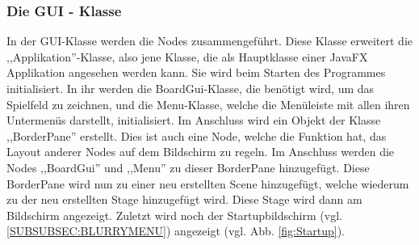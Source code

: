 \documentclass[12pt,a4paper]{article}
\begin{document}
\subsubsection{Die GUI - Klasse}
In der GUI-Klasse werden die Nodes zusammengeführt. Diese Klasse erweitert die ,,Applikation''-Klasse, also jene Klasse, die als Hauptklasse einer JavaFX Applikation angesehen werden kann. Sie wird beim Starten des Programmes initialisiert. In ihr werden die BoardGui-Klasse, die benötigt wird, um das Spielfeld zu zeichnen, und die Menu-Klasse, welche die Menüleiste mit allen ihren Untermenüs darstellt, initialisiert. Im Anschluss wird ein Objekt der Klasse ,,BorderPane'' erstellt. Dies ist auch eine Node, welche die Funktion hat, das Layout anderer Nodes auf dem Bildschirm zu regeln. Im Anschluss werden die Nodes ,,BoardGui'' und ,,Menu'' zu dieser BorderPane hinzugefügt. Diese BorderPane wird nun zu einer neu erstellten Scene hinzugefügt, welche wiederum zu der neu erstellten Stage hinzugefügt wird. Diese Stage wird dann am Bildschirm angezeigt. 
Zuletzt wird noch der Startupbildschirm (vgl. \ref{SUBSUBSEC:BLURRYMENU}) angezeigt (vgl. Abb. \ref{fig:Startup}).
\end{document}
